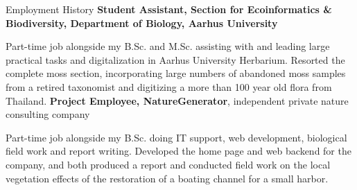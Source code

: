 \begin{rubric}{Employment History}
\entry*[2021 -- 2023]%
	\textbf{Student Assistant, Section for Ecoinformatics \& Biodiversity, Department of Biology, Aarhus University}\par
    \pind Part-time job alongside my B.Sc. and M.Sc. assisting with and leading large practical tasks and digitalization in Aarhus University Herbarium. Resorted the complete moss section, incorporating large numbers of abandoned moss samples from a retired taxonomist and digitizing a more than 100 year old flora from Thailand.
\entry*[2020 -- 2021]%
    \textbf{Project Employee, NatureGenerator}, independent private nature consulting company\par
    \pind Part-time job alongside my B.Sc. doing IT support, web development, biological field work and report writing. Developed the home page and web backend for the company, and both produced a report and conducted field work on the local vegetation effects of the restoration of a boating channel for a small harbor. 

\end{rubric}